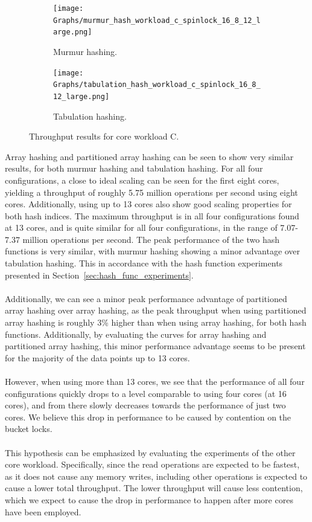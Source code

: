 \documentclass[11pt]{report} %
\begin{document}
\begin{figure}[ht]
  \centering
  \begin{subfigure}[b]{0.45\textwidth}
    \texttt{[image: Graphs/murmur\_hash\_workload\_c\_spinlock\_16\_8\_12\_large.png]}
    \caption[]{Murmur hashing.}
    \label{fig:mur_c}
  \end{subfigure} \hfill
  \begin{subfigure}[b]{0.45\textwidth}
    \texttt{[image: Graphs/tabulation\_hash\_workload\_c\_spinlock\_16\_8\_12\_large.png]}
    \caption[]{Tabulation hashing.}
    \label{fig:tab_c}
  \end{subfigure}
  \caption[]{Throughput results for core workload C.}
  \label{fig:res_c}
\end{figure}
\noindent
Array hashing and partitioned array hashing can be seen to show very similar results, for both murmur hashing and tabulation hashing. For all four configurations, a close to ideal scaling can be seen for the first eight cores, yielding a throughput of roughly 5.75 million operations per second using eight cores. Additionally, using up to 13 cores also show good scaling properties for both hash indices. The maximum throughput is in all four configurations found at 13 cores, and is quite similar for all four configurations,  in the range of 7.07-7.37 million operations per second. The peak performance of the two hash functions is very similar, with murmur hashing showing a minor advantage over tabulation hashing. This in accordance with the hash function experiments presented in Section~\ref{sec:hash_func_experiments}. \\
\\
Additionally, we can see a minor peak performance advantage of partitioned array hashing over array hashing, as the peak throughput when using partitioned array hashing is roughly 3\% higher than when using array hashing, for both hash functions. Additionally, by evaluating the curves for array hashing and partitioned array hashing, this minor performance advantage seems to be present for the majority of the data points up to 13 cores.\\
\\
However, when using more than 13 cores, we see that the performance of all four configurations quickly drops to a level comparable to using four cores (at 16 cores), and from there slowly decreases towards the performance of just two cores. We believe this drop in performance to be caused by contention on the bucket locks. \\
\\
This hypothesis can be emphasized by evaluating the experiments of the other core workload. Specifically, since the read operations are expected to be fastest, as it does not cause any memory writes, including other operations is expected to cause a lower total throughput. The lower throughput will cause less contention, which we expect to cause the drop in performance to happen after more cores have been employed.
\end{document}
